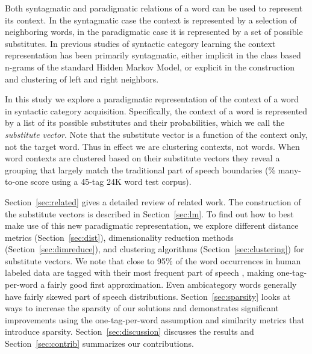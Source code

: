 Both syntagmatic and paradigmatic relations of a word can be used to
represent its context.  In the syntagmatic case the context is
represented by a selection of neighboring words, in the paradigmatic
case it is represented by a set of possible substitutes.  In previous
studies of syntactic category learning the context representation has
been primarily syntagmatic, either implicit in the class based n-grams
of the standard Hidden Markov Model, or explicit in the construction
and clustering of left and right neighbors.

In this study we explore a paradigmatic representation of the context
of a word in syntactic category acquisition.  Specifically, the
context of a word is represented by a list of its possible substitutes
and their probabilities, which we call the {\em substitute vector}.
Note that the substitute vector is a function of the context only, not
the target word.  Thus in effect we are clustering contexts, not
words.  When word contexts are clustered based on their substitute
vectors they reveal a grouping that largely match the traditional part
of speech boundaries (\collapseResult\% many-to-one score using a
45-tag 24K word test corpus).

Section~\ref{sec:related} gives a detailed review of related work.
The construction of the substitute vectors is described in
Section~\ref{sec:lm}.  To find out how to best make use of this new
paradigmatic representation, we explore different distance metrics
(Section~\ref{sec:dist}), dimensionality reduction methods
(Section~\ref{sec:dimreduce}), and clustering algorithms
(Section~\ref{sec:clustering}) for substitute vectors.  We note that
close to 95\% of the word occurrences in human labeled data are tagged
with their most frequent part of speech
\cite{Lee:2010:STU:1870658.1870741}, making one-tag-per-word a fairly
good first approximation.  Even ambicategory words generally have
fairly skewed part of speech distributions.
Section~\ref{sec:sparsity} looks at ways to increase the sparsity of
our solutions and demonstrates significant improvements using the
one-tag-per-word assumption and similarity metrics that introduce
sparsity.  Section~\ref{sec:discussion} discusses the results and
Section~\ref{sec:contrib} summarizes our contributions.


